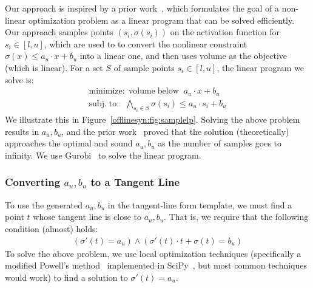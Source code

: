 Our approach is inspired by a prior
work~\cite{ryou2021scalable,balunovic2019certifying}, which formulates the goal of a non-linear optimization problem
as a linear program that can be solved efficiently. Our approach samples points
$ (s_i, \sigma(s_i)) $ on the activation function for  $ s_i \in [l, u] $,
which are used to to convert the nonlinear constraint $ \sigma(x) \leq a_u\cdot
x + b_u $ into a linear one, and then uses volume as the objective (which is
linear). For a set $ S $ of sample points $ s_i \in [l, u] $, the
linear program we solve is:
\begin{gather*}
	\mathrm{minimize:} \; \mathrm{volume \;below}\;\; a_u\cdot x + b_u \\
	\mathrm{subj.\; to:} \;\; \bigwedge_{s_i \in S}
	\sigma(s_i) \leq a_u\cdot s_i + b_u
\end{gather*}
We illustrate this in Figure~\ref{offlinesyn:fig:samplelp}.
Solving the above problem results in $ a_u, b_u $, and the prior
work~\cite{ryou2021scalable,balunovic2019certifying} proved that the solution
(theoretically) approaches the optimal and sound $ a_u, b_u $ as the number of
samples goes to infinity. We use Gurobi~\cite{gurobi} to solve the linear
program.

\subsubsection{Converting $ a_u, b_u $ to a Tangent Line}
To use the generated $ a_u, b_u $ in the tangent-line form template,
we must find a point $ t $ whose tangent line is close to $ a_u, b_u $.
That is, we require that the following condition (almost) holds:
\begin{gather*}
	(\sigma'(t) = a_u) \wedge (\sigma'(t)\cdot t + \sigma(t) = b_u)
\end{gather*}
To solve the above problem, we use local optimization techniques (specifically a
modified Powell's method~\cite{powell1964efficient} implemented in
SciPy~\cite{2020SciPy-NMeth}, but most common techniques would work) to find a
solution to $ \sigma'(t) = a_u $.


